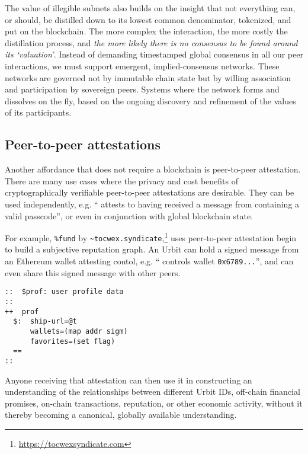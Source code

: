 \documentclass[twoside]{article}
\begin{document}
The value of illegible subnets also builds on the insight that not everything can, or should, be distilled down to its lowest common denominator, tokenized, and put on the blockchain. The more complex the interaction, the more costly the distillation process, and \emph{the more likely there is no consensus to be found around its `valuation'}. Instead of demanding timestamped global consensus in all our peer interactions, we must support emergent, implied-consensus networks. These networks are governed not by immutable chain state but by willing association and participation by sovereign peers. Systems where the network forms and dissolves on the fly, based on the ongoing discovery and refinement of the values of its participants.

\subsection{Peer-to-peer attestations}

Another affordance that does not require a blockchain is peer-to-peer attestation. There are many use cases where the privacy and cost benefits of cryptographically verifiable peer-to-peer attestations are desirable. They can be used independently, e.g. `` attests to having received a message from  containing a valid passcode'', or even in conjunction with global blockchain state.

\sloppy
For example, \lstinline[style=inlinecode]{%fund} by \lstinline[style=inlinecode]{~tocwex.syndicate},\footnote{\url{https://tocwexsyndicate.com}} uses peer-to-peer attestation begin to build a subjective reputation graph. An Urbit can hold a signed message from an Ethereum wallet attesting contol, e.g. `` controls wallet \lstinline[style=inlinecode]{0x6789...}'', and can even share this signed message with other peers.

\begin{lstlisting}[style=listingcode]
::  $prof: user profile data
::
++  prof
  $:  ship-url=@t
      wallets=(map addr sigm)
      favorites=(set flag)
  ==
::
\end{lstlisting}

\noindent{}
Anyone receiving that attestation can then use it in constructing an understanding of the relationships between different Urbit IDs, off-chain financial promises, on-chain transactions, reputation, or other economic activity, without it thereby becoming a canonical, globally available understanding.
\end{document}
